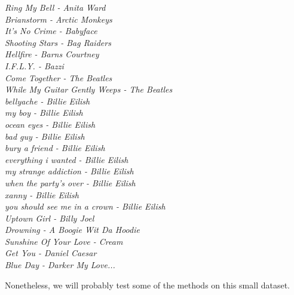 \textit{Ring My Bell - Anita Ward\\
Brianstorm - Arctic Monkeys\\
It's No Crime - Babyface\\
Shooting Stars - Bag Raiders\\
Hellfire - Barns Courtney\\
I.F.L.Y. - Bazzi\\
Come Together - The Beatles\\
While My Guitar Gently Weeps - The Beatles\\
bellyache - Billie Eilish\\
my boy - Billie Eilish\\
ocean eyes - Billie Eilish\\
bad guy - Billie Eilish\\
bury a friend - Billie Eilish\\
everything i wanted - Billie Eilish\\
my strange addiction - Billie Eilish\\
when the party's over - Billie Eilish\\
xanny - Billie Eilish\\
you should see me in a crown - Billie Eilish\\
Uptown Girl - Billy Joel\\
Drowning - A Boogie Wit Da Hoodie\\
Sunshine Of Your Love - Cream\\
Get You - Daniel Caesar\\
Blue Day - Darker My Love...}

Nonetheless, we will probably test some of the methods on this small dataset.